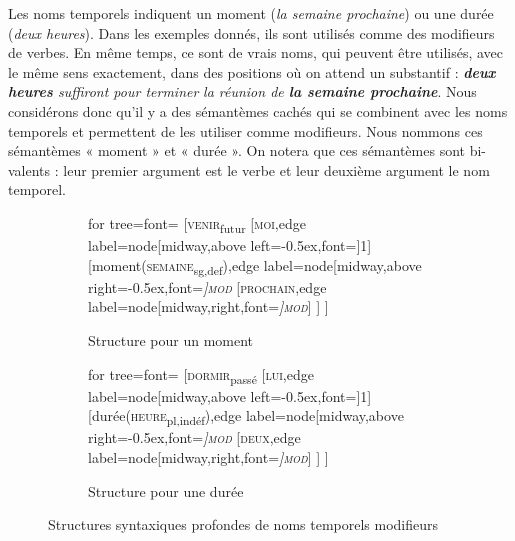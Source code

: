 { Les noms temporels indiquent un moment (\textit{la semaine prochaine}) ou une durée (\textit{deux heures}). Dans les exemples donnés, ils sont utilisés comme des modifieurs de verbes. En même temps, ce sont de vrais noms, qui peuvent être utilisés, avec le même sens exactement, dans des positions où on attend un substantif : \textit{\textbf{deux heures} suffiront pour terminer} \textit{la réunion de \textbf{la semaine prochaine}}. Nous considérons donc qu’il y a des sémantèmes cachés qui se combinent avec les noms temporels et permettent de les utiliser comme modifieurs. Nous nommons ces sémantèmes « moment » et « durée ». On notera que ces sémantèmes sont bi-valents : leur premier argument est le verbe et leur deuxième argument le nom temporel.

\begin{figure}[H]
	\begin{subfigure}[b]{0.5\textwidth}
		\centering
		\begin{forest} for tree={font=\normalfont}
			[\textsc{venir}\textsubscript{futur}
			[\textsc{moi},edge label={node[midway,above left=-0.5ex,font=\footnotesize]{1}}]
			[moment(\textsc{semaine}\textsubscript{sg,def}),edge label={node[midway,above right=-0.5ex,font=\footnotesize\itshape]{\textsc{mod}}}
			[\textsc{prochain},edge label={node[midway,right,font=\footnotesize\itshape]{\textsc{mod}}}]
			]
			]
		\end{forest}
		\caption{Structure pour un moment}
	\end{subfigure}%
	\hfill
	\begin{subfigure}[b]{0.5\textwidth}
		\centering
		\begin{forest} for tree={font=\normalfont}
			[\textsc{dormir}\textsubscript{passé}
			[\textsc{lui},edge label={node[midway,above left=-0.5ex,font=\footnotesize]{1}}]
			[durée(\textsc{heure}\textsubscript{pl,indéf}),edge label={node[midway,above right=-0.5ex,font=\footnotesize\itshape]{\textsc{mod}}}
			[\textsc{deux},edge label={node[midway,right,font=\footnotesize\itshape]{\textsc{mod}}}]
			]
			]
		\end{forest}
		\caption{Structure pour une durée}
	\end{subfigure}
\caption{Structures syntaxiques profondes de noms temporels modifieurs}
\end{figure}

}

